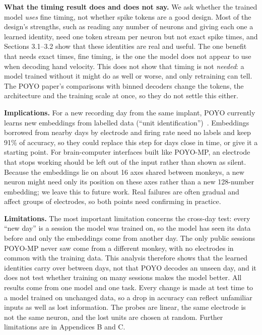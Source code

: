 \documentclass[11pt]{article}
\begin{document}
\textbf{What the timing result does and does not say.} We ask whether the trained model \emph{uses} fine timing, not whether spike tokens are a good design. Most of the design's strengths, such as reading any number of neurons and giving each one a learned identity, need one token stream per neuron but not exact spike times, and Sections 3.1--3.2 show that these identities are real and useful. The one benefit that needs exact times, fine timing, is the one the model does not appear to use when decoding hand velocity. This does not show that timing is not \emph{needed}: a model trained without it might do as well or worse, and only retraining can tell. The POYO paper's comparisons with binned decoders change the tokens, the architecture and the training scale at once, so they do not settle this either.

\textbf{Implications.} For a new recording day from the same implant, POYO currently learns new embeddings from labelled data (``unit identification'')~\cite{ref1}. Embeddings borrowed from nearby days by electrode and firing rate need no labels and keep 91\% of accuracy, so they could replace this step for days close in time, or give it a starting point. For brain-computer interfaces built like POYO-MP, an electrode that stops working should be left out of the input rather than shown as silent. Because the embeddings lie on about 16 axes shared between monkeys, a new neuron might need only its position on these axes rather than a new 128-number embedding; we leave this to future work. Real failures are often gradual and affect groups of electrodes, so both points need confirming in practice.

\textbf{Limitations.} The most important limitation concerns the cross-day test: every ``new day'' is a session the model was trained on, so the model has seen its data before and only the embeddings come from another day. The only public sessions POYO-MP never saw come from a different monkey, with no electrodes in common with the training data. This analysis therefore shows that the learned identities carry over between days, not that POYO decodes an unseen day, and it does not test whether training on many sessions makes the model better. All results come from one model and one task. Every change is made at test time to a model trained on unchanged data, so a drop in accuracy can reflect unfamiliar inputs as well as lost information. The probes are linear, the same electrode is not the same neuron, and the lost units are chosen at random. Further limitations are in Appendices B and C.
\end{document}
